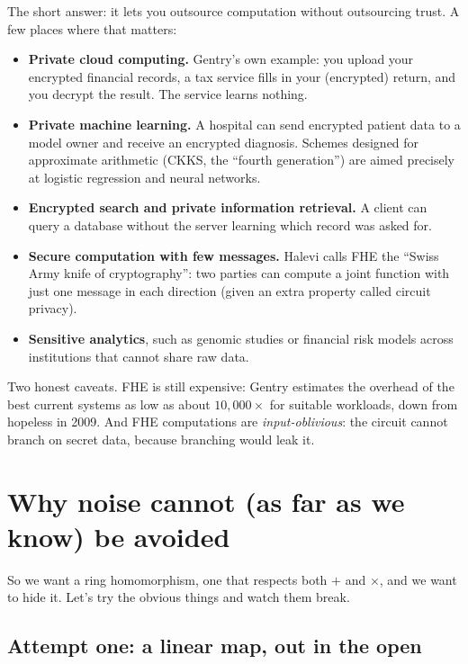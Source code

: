 \documentclass[11pt,a4paper]{article}
\begin{document}
The short answer: it lets you outsource computation without outsourcing
trust. A few places where that matters:
\begin{itemize}[leftmargin=*]
\item \textbf{Private cloud computing.} Gentry's own example: you upload
  your encrypted financial records, a tax service fills in your (encrypted)
  return, and you decrypt the result. The service learns nothing.
\item \textbf{Private machine learning.} A hospital can send encrypted
  patient data to a model owner and receive an encrypted diagnosis. Schemes
  designed for approximate arithmetic (CKKS, the ``fourth generation'') are
  aimed precisely at logistic regression and neural networks.
\item \textbf{Encrypted search and private information retrieval.} A client
  can query a database without the server learning which record was asked
  for.
\item \textbf{Secure computation with few messages.} Halevi calls FHE the
  ``Swiss Army knife of cryptography'': two parties can compute a joint
  function with just one message in each direction (given an extra
  property called circuit privacy).
\item \textbf{Sensitive analytics}, such as genomic studies or financial
  risk models across institutions that cannot share raw data.
\end{itemize}
Two honest caveats. FHE is still expensive: Gentry estimates the overhead of
the best current systems as low as about $10{,}000\times$ for suitable
workloads, down from hopeless in 2009. And FHE computations are
\emph{input-oblivious}: the circuit cannot branch on secret data, because
branching would leak it.

\section{Why noise cannot (as far as we know) be avoided}

So we want a ring homomorphism, one that respects both $+$ and $\times$, and
we want to hide it. Let's try the obvious things and watch them break.

\subsection{Attempt one: a linear map, out in the open}
\end{document}
